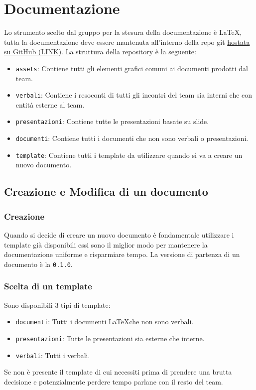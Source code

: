 \section{Documentazione}

Lo strumento scelto dal gruppo per la stesura della documentazione è \LaTeX,
tutta la documentazione deve essere mantenuta all'interno della repo git
\href{https://github.com/Club-Swendwich/Documenti}{hostata su GitHub (LINK)}.
La struttura della repository è la seguente:
\begin{itemize}
    \item \texttt{assets}: Contiene tutti gli elementi grafici comuni ai documenti
        prodotti dal team.
    \item \texttt{verbali}: Contiene i resoconti di tutti gli incontri del team sia
        interni che con entità esterne al team.
    \item \texttt{presentazioni}: Contiene tutte le presentazioni basate su slide.
    \item \texttt{documenti}: Contiene tutti i documenti che non sono verbali o
        presentazioni.
    \item \texttt{template}: Contiene tutti i template da utilizzare quando si va a
        creare un nuovo documento.
\end{itemize}

\subsection{Creazione e Modifica di un documento}

\subsubsection{Creazione}
Quando si decide di creare un nuovo documento è fondamentale utilizzare i template già
disponibili essi sono il miglior modo per mantenere la documentazione uniforme e
risparmiare tempo.
La versione di partenza di un documento è la \texttt{0.1.0}.

\subsubsection{Scelta di un template}

Sono disponibili 3 tipi di template:
\begin{itemize}
    \item \texttt{documenti}: Tutti i documenti \LaTeX che non sono verbali.
    \item \texttt{presentazioni}: Tutte le presentazioni sia esterne che interne.
    \item \texttt{verbali}: Tutti i verbali.
\end{itemize}
Se non è presente il template di cui necessiti prima di prendere una brutta decisione
e potenzialmente perdere tempo parlane con il resto del team.

